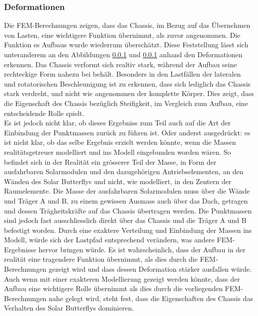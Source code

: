 \subsubsection{Deformationen}
Die FEM-Berechnungen zeigen, dass das Chassis, im Bezug auf das Übernehmen von Lasten, eine wichtigere Funktion übernimmt, als zuvor angenommen. Die Funktion es Aufbaus wurde wiederrum überschätzt. Diese Feststellung lässt sich unteranderem an den Abbildungen \ref{} und \ref{} anhand den Deformationen erkennen. Das Chassis verformt sich realtiv stark, während der Aufbau seine rechteckige Form nahezu bei behält. Besonders in den Lastfällen der lateralen und rotatorischen Beschleunigung ist zu erkennen, dass sich lediglich das Chassis stark verdreht, und nicht wie angenommen der komplette Körper. Dies zeigt, dass die Eigenschaft des Chassis bezüglich Steifigkeit, im Vergleich zum Aufbau, eine entscheidende Rolle spielt. \\

Es ist jedoch nicht klar, ob dieses Ergebniss zum Teil auch auf die Art der Einbindung der Punktmassen zurück zu führen ist. Oder anderst ausgedrückt: es ist nicht klar, ob das selbe Ergebnis erzielt werden könnte, wenn die Massen realitätsgetreuer modelliert und ins Modell eingebunden worden wären. So befindet sich in der Realität ein grösserer Teil der Masse, in Form der ausfahrbaren Solarmodulen und den dazugehörigen Antriebselementen, an den Wänden des Solar Butterflys und nicht, wie modelliert, in den Zentern der Raumelemente.
Die Masse der ausfahrbaren Solarmodulen muss über die Wände und Träger A und B, zu einem gewissen Ausmass auch über das Dach, getragen und dessen Trägheitskräfte auf das Chassis übertragen werden. Die Punktmassen sind jedoch fast ausschliesslich direkt über das Chassis und die Träger A und B befestigt worden. Durch eine exaktere Verteilung und Einbindung der Massen ins Modell, würde sich der Lastpfad entsprechend verändern, was andere FEM-Ergebnisse hervor bringen würde.
Es ist wahrscheinlich, dass der Aufbau in der realität eine tragendere Funktion übernimmt, als dies durch die FEM-Berechnungen gezeigt wird und dass dessen Deformation stärker ausfallen würde.\\
Auch wenn mit einer exakteren Modellierung gezeigt werden könnte, dass der Aufbau eine wichtigere Rolle übernimmt als dies durch die vorliegenden FEM-Berechnungen nahe gelegt wird, steht fest, dass die Eigenschaften des Chassis das Verhalten des Solar Butterflys dominieren.\\

